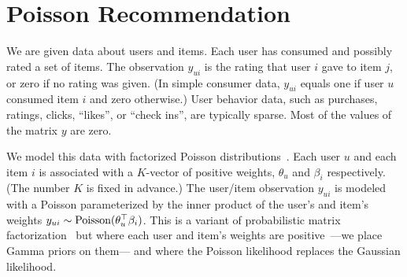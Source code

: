 \documentclass{sig-alternate}
\begin{document}




\section{Poisson Recommendation}
\label{sec:model}


We are given data about users and items.  Each user has consumed and
possibly rated a set of items.  The observation $y_{ui}$ is the rating
that user $i$ gave to item $j$, or zero if no rating was given.  (In
simple consumer data, $y_{ui}$ equals one if user $u$ consumed item
$i$ and zero otherwise.)  User behavior data, such as purchases,
ratings, clicks, ``likes'', or ``check ins'', are typically sparse.
Most of the values of the matrix $y$ are zero.

We model this data with factorized Poisson
distributions~\cite{Canny:2004}. Each user $u$ and each item $i$ is
associated with a $K$-vector of positive weights, $\theta_u$ and
$\beta_i$ respectively.  (The number $K$ is fixed in advance.)  The
user/item observation $y_{ui}$ is modeled with a Poisson parameterized
by the inner product of the user's and item's weights $y_{ui} \sim
\textrm{Poisson}(\theta_u^\top \beta_i)$.  This is a variant of
probabilistic matrix factorization~\cite{Salakhutdinov:2008a} but
where each user and item's weights are positive~\cite{Lee:1999}---we
place Gamma priors on them--- and where the Poisson likelihood
replaces the Gaussian likelihood.
\end{document}
